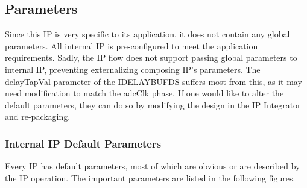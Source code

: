 \documentclass[11pt]{article}
\begin{document}
\subsection{Parameters}
Since this IP is very specific to its application, it does not contain any global parameters. All internal IP is pre-configured to meet the application
requirements. Sadly, the IP flow does not support passing global parameters to internal IP, preventing externalizing composing IP's parameters. The 
delayTapVal parameter of the IDELAYBUFDS suffers most from this, as it may need modification to match the adcClk phase. If one would like to alter the
default parameters, they can do so by modifying the design in the IP Integrator and re-packaging.
\subsubsection{Internal IP Default Parameters}
Every IP has default parameters, most of which are obvious or are described by the IP operation. The important parameters are listed in the following
figures.
\end{document}
